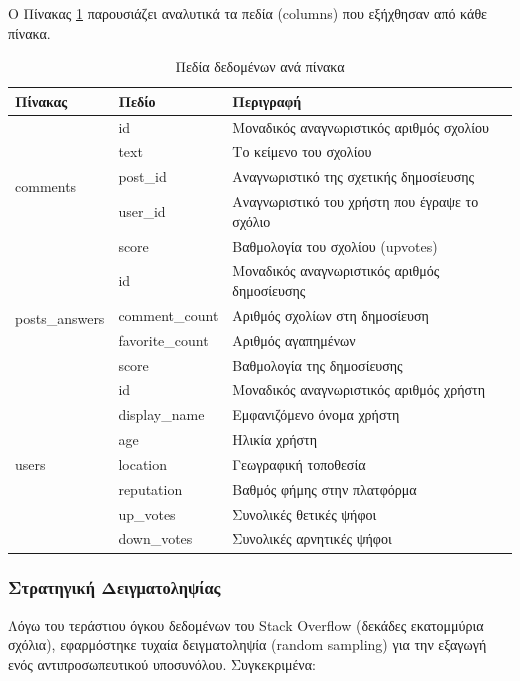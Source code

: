 \documentclass[a4paper,11pt,oneside,openany]{ioniothesis}
\begin{document}
Ο Πίνακας \ref{tab:dataset_columns} παρουσιάζει αναλυτικά τα πεδία (columns) που εξήχθησαν από κάθε πίνακα.

\begin{table}[H]
\centering
\caption{Πεδία δεδομένων ανά πίνακα}
\label{tab:dataset_columns}
\begin{tabular}{@{}llp{7cm}@{}}
\toprule
\textbf{Πίνακας} & \textbf{Πεδίο} & \textbf{Περιγραφή} \\
\midrule
\multirow{5}{*}{comments} 
    & id & Μοναδικός αναγνωριστικός αριθμός σχολίου \\
    & text & Το κείμενο του σχολίου \\
    & post\_id & Αναγνωριστικό της σχετικής δημοσίευσης \\
    & user\_id & Αναγνωριστικό του χρήστη που έγραψε το σχόλιο \\
    & score & Βαθμολογία του σχολίου (upvotes) \\
\midrule
\multirow{4}{*}{posts\_answers} 
    & id & Μοναδικός αναγνωριστικός αριθμός δημοσίευσης \\
    & comment\_count & Αριθμός σχολίων στη δημοσίευση \\
    & favorite\_count & Αριθμός αγαπημένων \\
    & score & Βαθμολογία της δημοσίευσης \\
\midrule
\multirow{7}{*}{users} 
    & id & Μοναδικός αναγνωριστικός αριθμός χρήστη \\
    & display\_name & Εμφανιζόμενο όνομα χρήστη \\
    & age & Ηλικία χρήστη \\
    & location & Γεωγραφική τοποθεσία \\
    & reputation & Βαθμός φήμης στην πλατφόρμα \\
    & up\_votes & Συνολικές θετικές ψήφοι \\
    & down\_votes & Συνολικές αρνητικές ψήφοι \\
\bottomrule
\end{tabular}
\end{table}

\subsubsection{Στρατηγική Δειγματοληψίας}

Λόγω του τεράστιου όγκου δεδομένων του Stack Overflow (δεκάδες εκατομμύρια σχόλια), εφαρμόστηκε τυχαία δειγματοληψία (random sampling) για την εξαγωγή ενός αντιπροσωπευτικού υποσυνόλου. Συγκεκριμένα:
\end{document}
